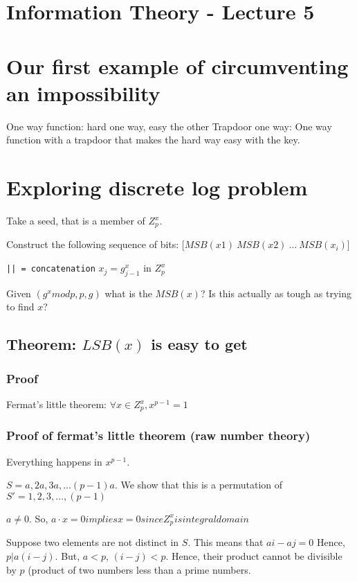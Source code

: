 \section{Information Theory - Lecture 5}
\section{Our first example of circumventing an impossibility}

One way function: hard one way, easy the other
Trapdoor one way: One way function with a trapdoor that makes the hard way easy with the key.

\section{Exploring discrete log problem}

Take a seed, that is a member of $Z_p^x$.

Construct the following sequence of bits: 
$\lbrack MSB (x1)~MSB (x2) ~\dots~MSB(x_i) \rbrack$

\texttt{|| = concatenation}
$x_j =  g^x_{j - 1}$ in $Z_p^x$


Given $(g^x mod p, p, g)$ what is the $MSB(x)$? Is this actually as tough
as trying to find $x$?


\subsection{Theorem: $LSB(x)$ is easy to get}
\subsubsection{Proof}


Fermat's little theorem: $\forall x \in Z_p^x, x^{p - 1} = 1$
\subsubsection{Proof of fermat's little theorem (raw number theory)}
Everything happens in $x^{p - 1}$.

$S = {a, 2a, 3a, ... (p - 1)a}$.
We show that this is a permutation of
$S' = {1, 2, 3, ..., (p - 1) }$

$a \neq 0$. So, $a \cdot x = 0 implies x = 0 since Z_p^x is integral domain$

Suppose two elements are not distinct in $S$. This means that $ai - aj = 0$
Hence, $p | a(i - j)$. But, $a < p$, $(i - j) < p$. Hence, their product 
cannot be divisible by $p$ (product of two numbers less than a prime numbers.


